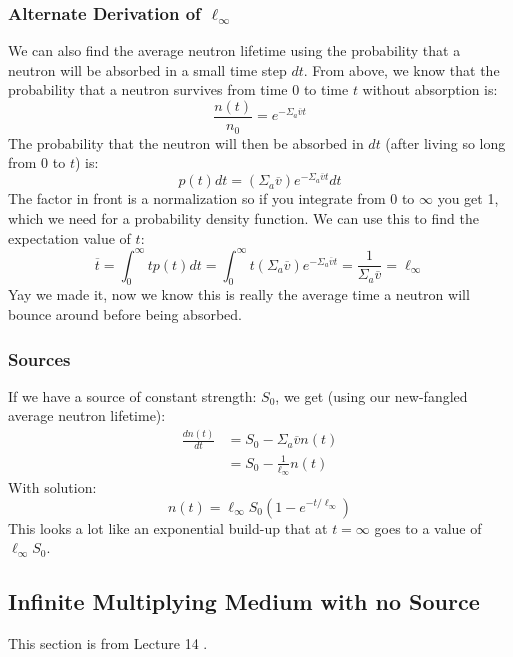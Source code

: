 \documentclass[letter]{article}
\begin{document}
\subsubsection{Alternate Derivation of $\ell_\infty$}

We can also find the average neutron lifetime using the probability
that a neutron will be absorbed in a small time step $dt$. From above,
we know that the probability that a neutron survives from time 0 to
time $t$ without absorption is:
\begin{equation*}
    \frac{n(t)}{n_0}=e^{-\Sigma_a\overline{v}t}
\end{equation*}
The probability that the neutron will then be absorbed in $dt$ (after living
so long from 0 to $t$) is:
\begin{equation*}
  p(t)dt=(\Sigma_a\overline{v})e^{-\Sigma_a\overline{v}t}dt
\end{equation*}
The factor in front is a normalization so if you integrate from 0 to
$\infty$ you get 1, which we need for a probability density
function. We can use this to find the expectation value of $t$:
\begin{equation*}
  \overline{t}=\int^\infty_0tp(t)dt = \int^\infty_0t(\Sigma_a\overline{v})e^{-\Sigma_a\overline{v}t}=\frac{1}{\Sigma_a\overline{v}}=\ell_\infty
\end{equation*}
Yay we made it, now we know this is really the average time a neutron will bounce
around before being absorbed.

\subsubsection{Sources}

If we have a source of constant strength: $S_0$, we get (using our
new-fangled average neutron lifetime):
\begin{equation*}
  \begin{split}
    \frac{dn(t)}{dt}&=S_0-\Sigma_a\overline{v}n(t) \\
    &= S_0-\frac{1}{\ell_\infty}n(t)
  \end{split}
\end{equation*}
With solution:
\begin{equation*}
  n(t)=\ell_\infty S_0(1-e^{-t/\ell_\infty})
\end{equation*}
This looks a lot like an exponential build-up that at $t=\infty$ goes
to a value of $\ell_\infty S_0$.

\subsection{Infinite Multiplying Medium with no Source}
This section is from Lecture 14 \cite{lecture}.
\end{document}
